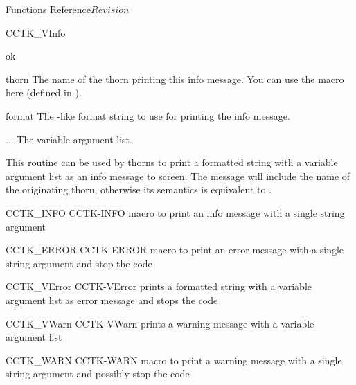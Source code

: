 \begin{cactuspart}{ Functions Reference}{}{$Revision$}
\begin{FunctionDescription}{CCTK\_VInfo}
\begin{ResultSection}
\begin{Result}{0} ok \end{Result}
\end{ResultSection}

\begin{ParameterSection}
\begin{Parameter}{thorn}
The name of the thorn printing this info message. You can use the
 macro here (defined in ).
\end{Parameter}
\begin{Parameter}{format}
The -like format string to use for printing the info message.
\end{Parameter}
\begin{Parameter}{...}
The variable argument list.
\end{Parameter}
\end{ParameterSection}

\begin{Discussion}
This routine can be used by thorns to print a formatted string with a variable
argument list as an info message to screen.
The message will include the name of the originating thorn, otherwise its
semantics is equivalent to .
\end{Discussion}

\begin{SeeAlsoSection}
\begin{SeeAlso2} {CCTK\_INFO} {CCTK-INFO}
macro to print an info message with a single string argument
\end{SeeAlso2}
\begin{SeeAlso2} {CCTK\_ERROR} {CCTK-ERROR}
macro to print an error message with a single string argument and stop
the code
\end{SeeAlso2}
\begin{SeeAlso2} {CCTK\_VError} {CCTK-VError}
prints a formatted string with a variable argument list as error
message and stops the code
\end{SeeAlso2}
\begin{SeeAlso2} {CCTK\_VWarn} {CCTK-VWarn}
prints a warning message with a variable argument list
\end{SeeAlso2}
\begin{SeeAlso2} {CCTK\_WARN} {CCTK-WARN}
macro to print a warning message with a single string argument and
possibly stop the code
\end{SeeAlso2}
\end{SeeAlsoSection}


\end{FunctionDescription}
\end{cactuspart}
